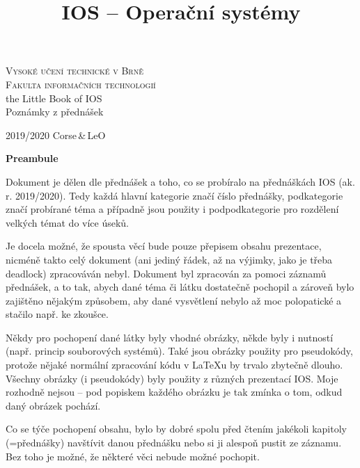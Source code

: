 \documentclass[a4paper, 11pt]{article}
\title{IOS -- Operační systémy}
\date{}
\begin{document}
\begin{titlepage}

\begin{center}
\LARGE
\textsc{\Huge Vysoké učení technické v Brně}\\
\textsc{\huge Fakulta informačních technologií}\\
the Little Book of IOS\\[0.4em]
{\Huge Poznámky z přednášek}
\end{center}
{\Large 2019/2020 \hfill Corse\scriptsize\,\&\,LeO}

\end{titlepage}


\tableofcontents


\newpage

\textbf{Preambule}

Dokument je dělen dle přednášek a toho, co se probíralo na přednáškách IOS (ak. r. 2019/2020). Tedy každá hlavní kategorie značí číslo přednášky, podkategorie značí probírané téma a případně jsou použity i pod\-pod\-ka\-te\-go\-ri\-e pro rozdělení velkých témat do více úseků.

Je docela možné, že spousta věcí bude pouze přepisem obsahu prezentace, nicméně takto celý dokument (ani jediný řádek, až na výjimky, jako je třeba deadlock) zpracováván nebyl. Dokument byl zpracován za pomoci záznamů přednášek, a to tak, abych dané téma či látku dostatečně pochopil a zároveň bylo zajištěno nějakým způsobem, aby dané vysvětlení nebylo až moc polopatické a stačilo např. ke zkoušce.
 
Někdy pro pochopení dané látky byly vhodné obrázky, někde byly i nutností (např. princip souborových systémů). Také jsou obrázky použity pro pseudokódy, protože nějaké normální zpracování kódu v \LaTeX u by trvalo zbytečně dlouho. Všechny obrázky (i pseudokódy) byly použity z různých prezentací IOS. Moje rozhodně nejsou -- pod popiskem každého obrázku je tak zmínka o tom, odkud daný obrázek pochází.
 
Co se týče pochopení obsahu, bylo by dobré spolu před čtením jakékoli kapitoly (=přednášky) navštívit danou přednášku nebo si ji alespoň pustit ze záznamu. Bez toho je možné, že některé věci nebude možné pochopit. 

\newpage
\end{document}
